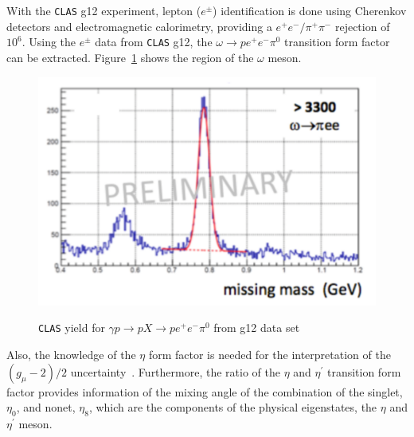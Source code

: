 \documentclass{aip-cp}
\begin{document}
With the \textsc{\texttt{CLAS}} g12 experiment, lepton ($e^{\pm}$) identification is done using Cherenkov detectors and electromagnetic calorimetry, providing a $e^{+}e^{-}/\pi^{+}\pi^{-}$ rejection of $10^6$. Using the $e^{\pm}$ data from \textsc{\texttt{CLAS}} g12, the $ \omega \to p e^+ e^- \pi^0$ transition form factor can be extracted. Figure~\ref{fig:clas_omega_ff} shows the region of the $\omega$ meson.
\begin{figure}[h!]
		\centering
		\centerline{\includegraphics[width=150 pt]{figures/clas_omega_ff_II.pdf}}
		\caption{\textsc{\texttt{CLAS}} yield for $\gamma p \to p X \to p e^+ e^- \pi^0 $ from g12 data set}{}
		\label{fig:clas_omega_ff}
\end{figure}
Also, the knowledge of the $\eta$ form factor is needed for the interpretation of the $(g_{\mu}-2)/2$ uncertainty~\cite{gminus2}. Furthermore, the ratio of the $\eta$ and $\eta^{\prime}$ transition form factor provides information of the mixing angle of the combination of the singlet, $\eta_0$, and nonet, $\eta_8$, which are the components of the physical eigenstates, the $\eta$ and $\eta^{\prime}$ meson.
\end{document}
